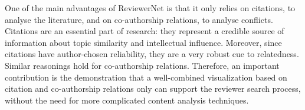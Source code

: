 One of the main advantages of ReviewerNet is that it only relies on citations, to analyse the literature, and on co-authorship relations, to analyse conflicts. Citations are an essential part of research: they represent a credible source of information about topic similarity and intellectual influence. Moreover, since citations have author-chosen reliability, they are a very robust cue to relatedness. Similar reasonings hold for co-authorship relations. Therefore, an important contribution is the demonstration that a well-combined visualization based on citation and co-authorship relations only can support the reviewer search process, without the need for more complicated content analysis techniques.  
